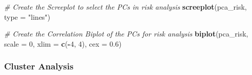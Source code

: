 \documentclass[11pt,a4paper,]{article}
\newenvironment{Shaded}{\begin{snugshade}}{\end{snugshade}}
\newcommand{\CommentTok}[1]{\textcolor[rgb]{0.56,0.35,0.01}{\textit{#1}}}
\newcommand{\DataTypeTok}[1]{\textcolor[rgb]{0.13,0.29,0.53}{#1}}
\newcommand{\DecValTok}[1]{\textcolor[rgb]{0.00,0.00,0.81}{#1}}
\newcommand{\FloatTok}[1]{\textcolor[rgb]{0.00,0.00,0.81}{#1}}
\newcommand{\KeywordTok}[1]{\textcolor[rgb]{0.13,0.29,0.53}{\textbf{#1}}}
\newcommand{\NormalTok}[1]{#1}
\newcommand{\OperatorTok}[1]{\textcolor[rgb]{0.81,0.36,0.00}{\textbf{#1}}}
\newcommand{\StringTok}[1]{\textcolor[rgb]{0.31,0.60,0.02}{#1}}
\begin{document}
\begin{Shaded}
\begin{Highlighting}[]
\CommentTok{# Create the Screeplot to select the PCs in risk analysis}
\KeywordTok{screeplot}\NormalTok{(pca_risk, }\DataTypeTok{type =} \StringTok{"lines"}\NormalTok{)}
\end{Highlighting}
\end{Shaded}

\begin{Shaded}
\end{Shaded}

\begin{Shaded}
\begin{Highlighting}[]
\CommentTok{# Create the Correlation Biplot of the PCs for risk analysis}
\KeywordTok{biplot}\NormalTok{(pca_risk, }\DataTypeTok{scale =} \DecValTok{0}\NormalTok{, }\DataTypeTok{xlim =} \KeywordTok{c}\NormalTok{(}\OperatorTok{-}\DecValTok{4}\NormalTok{, }\DecValTok{4}\NormalTok{), }\DataTypeTok{cex =} \FloatTok{0.6}\NormalTok{)}
\end{Highlighting}
\end{Shaded}

\hypertarget{cluster-analysis-1}{%
\subsubsection{Cluster Analysis}\label{cluster-analysis-1}}

\begin{Shaded}
\end{Shaded}
\end{document}

